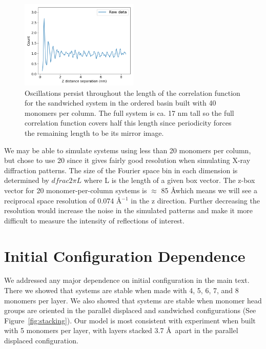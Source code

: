 \documentclass[journal=jpcbfk,manusciprt=article]{achemso}
\begin{document}
  \begin{figure}
  \centering
  \includegraphics[width=0.5\textwidth]{tall_correlation_full.png}
  \caption{Oscillations persist throughout the length of the correlation 
  function for the sandwiched system in the ordered basin built with 40 monomers
  per column. The full system is ca. 17 nm tall so the full correlation function
  covers half this length since periodicity forces the remaining length to be its
  mirror image.}\label{fig:tall_correlation_full}
  \end{figure}
  
  We may be able to simulate systems using less than 20 monomers per column, but chose
  to use 20 since it gives fairly good resolution when simulating X-ray diffraction 
  patterns. The size of the Fourier space bin in each dimension is determined by 
  $dfrac{2\pi}{L}$ where L is the length of a given box vector. The z-box vector 
  for 20 monomer-per-column systems is $\approx$ 85 \AA which means we will see 
  a reciprocal space resolution of 0.074 \AA$^{-1}$ in the z direction. Further decreasing
  the resolution would increase the noise in the simulated patterns and make it more
  difficult to measure the intensity of reflections of interest.

  \section{Initial Configuration Dependence}\label{section:initial_config_dependence}

  \vspace{1em}
  We addressed any major dependence on initial configuration in the main text.
  There we showed that systems are stable when made with 4, 5, 6, 7, and 8
  monomers per layer. We also showed that systems are stable when monomer head
  groups are oriented in the parallel displaced and sandwiched configurations
  (See Figure~\ref{fig:stacking}). Our model is most consistent with experiment
  when built with 5 monomers per layer, with layers stacked 3.7 \AA~apart in 
  the parallel displaced configuration. 
\end{document}
